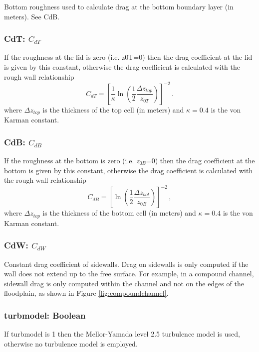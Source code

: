 Bottom roughness used to calculate drag at the bottom boundary layer (in meters).  See CdB.

\subsubsection{CdT: $C_{dT}$}

If the roughness at the lid is zero (i.e. z0T=0) then the drag coefficient at the lid is given by
this constant, otherwise the drag coefficient is calculated with the rough wall 
relationship
\[
C_{dT} = \left[\frac{1}{\kappa}\ln\left(\frac{1}{2}\frac{\Delta z_{top}}{z_{0T}}\right)\right]^{-2}\,.
\]
where $\Delta z_{top}$ is the thickness of the top cell (in meters) and $\kappa=0.4$ is the von Karman constant.

\subsubsection{CdB: $C_{dB}$}

If the roughness at the bottom is zero (i.e. $z_{0B}$=0) then the drag coefficient at the bottom is given by
this constant, otherwise the drag coefficient is calculated with the rough wall
relationship
\[
C_{dB} = \left[\ln\left(\frac{1}{2}\frac{\Delta z_{bot}}{z_{0B}}\right)\right]^{-2}\,,
\]
where $\Delta z_{top}$ is the thickness of the bottom cell (in meters) and $\kappa=0.4$ is the von Karman constant.

\subsubsection{CdW: $C_{dW}$}

Constant drag coefficient of sidewalls.  Drag on sidewalls is only computed if the wall
does not extend up to the free surface.  For example, in a compound channel, sidewall
drag is only computed within the channel and not on the edges of the floodplain, as shown
in Figure \ref{fig:compoundchannel}.

\subsubsection{turbmodel: Boolean}

If turbmodel is 1 then the Mellor-Yamada level 2.5 turbulence model is used, otherwise
no turbulence model is employed.  

